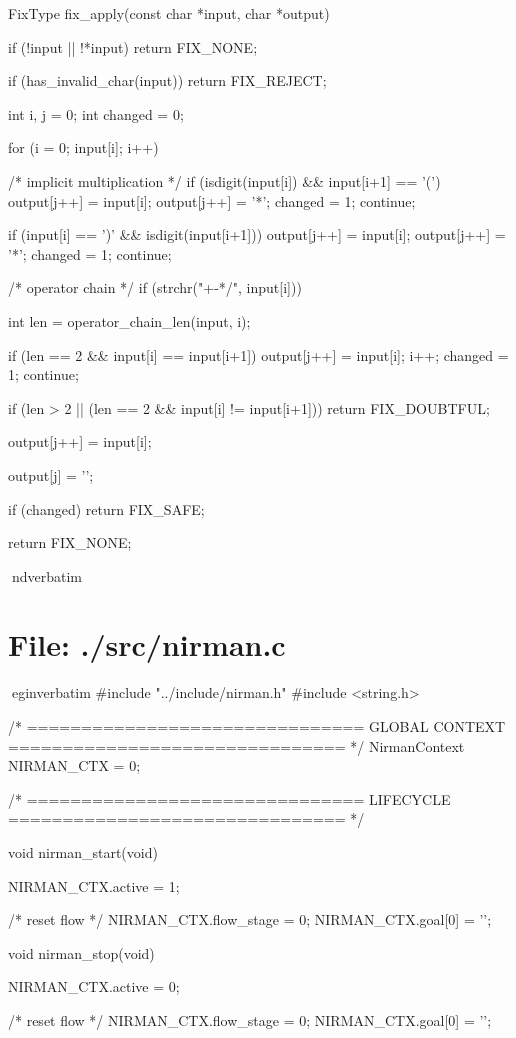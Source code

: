 \documentclass{article}
\begin{document}
FixType fix_apply(const char *input, char *output)
{
    if (!input || !*input)
        return FIX_NONE;

    if (has_invalid_char(input))
        return FIX_REJECT;

    int i, j = 0;
    int changed = 0;

    for (i = 0; input[i]; i++)
    {
        /* implicit multiplication */
        if (isdigit(input[i]) && input[i+1] == '(')
        {
            output[j++] = input[i];
            output[j++] = '*';
            changed = 1;
            continue;
        }

        if (input[i] == ')' && isdigit(input[i+1]))
        {
            output[j++] = input[i];
            output[j++] = '*';
            changed = 1;
            continue;
        }

        /* operator chain */
        if (strchr("+-*/", input[i]))
        {
            int len = operator_chain_len(input, i);

            if (len == 2 && input[i] == input[i+1])
            {
                output[j++] = input[i];
                i++;
                changed = 1;
                continue;
            }

            if (len > 2 || (len == 2 && input[i] != input[i+1]))
            {
                return FIX_DOUBTFUL;
            }
        }

        output[j++] = input[i];
    }

    output[j] = '\0';

    if (changed)
        return FIX_SAFE;

    return FIX_NONE;
}
nd{verbatim}
\section*{File: ./src/nirman.c}
egin{verbatim}
#include "../include/nirman.h"
#include <string.h>

/* ===============================
   GLOBAL CONTEXT
   =============================== */
NirmanContext NIRMAN_CTX = {0};

/* ===============================
   LIFECYCLE
   =============================== */

void nirman_start(void)
{
    NIRMAN_CTX.active = 1;

    /* reset flow */
    NIRMAN_CTX.flow_stage = 0;
    NIRMAN_CTX.goal[0] = '\0';
}

void nirman_stop(void)
{
    NIRMAN_CTX.active = 0;

    /* reset flow */
    NIRMAN_CTX.flow_stage = 0;
    NIRMAN_CTX.goal[0] = '\0';
}
\end{document}
